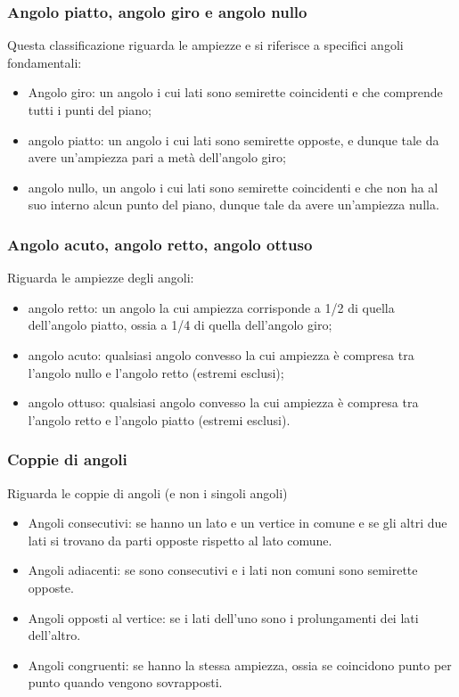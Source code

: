 \documentclass{report}
\begin{document}

\subsubsection{Angolo piatto, angolo giro e angolo nullo} %
\label{sec:Angolo piatto, angolo giro e angolo nullo}
Questa classificazione riguarda le ampiezze e si riferisce a specifici angoli fondamentali:
\begin{itemize}
  \item{Angolo giro: un angolo i cui lati sono semirette coincidenti e che comprende tutti i punti del piano;}
  \item{angolo piatto: un angolo i cui lati sono semirette opposte, e dunque tale da avere un'ampiezza pari a metà dell'angolo giro;}
  \item{angolo nullo, un angolo i cui lati sono semirette coincidenti e che non ha al suo interno alcun punto del piano, dunque tale da avere un'ampiezza nulla.}
\end{itemize}


\subsubsection{Angolo acuto, angolo retto, angolo ottuso} %
\label{sec:Angolo acuto, angolo retto, angolo ottuso}
Riguarda le ampiezze degli angoli:
\begin{itemize}
  \item{angolo retto: un angolo la cui ampiezza corrisponde a 1/2 di quella dell'angolo piatto, ossia a 1/4 di quella dell'angolo giro;}
  \item{angolo acuto: qualsiasi angolo convesso la cui ampiezza è compresa tra l'angolo nullo e l'angolo retto (estremi esclusi);}
  \item{angolo ottuso: qualsiasi angolo convesso la cui ampiezza è compresa tra l'angolo retto e l'angolo piatto (estremi esclusi).}
\end{itemize}

\subsubsection{Coppie di angoli} %
\label{sec:Coppie di angoli}
Riguarda le coppie di angoli (e non i singoli angoli)
\begin{itemize}
  \item{Angoli consecutivi: se hanno un lato e un vertice in comune e se gli altri due lati si trovano da parti opposte rispetto al lato comune.}
  \item{Angoli adiacenti: se sono consecutivi e i lati non comuni sono semirette opposte.}
  \item{Angoli opposti al vertice: se i lati dell'uno sono i prolungamenti dei lati dell'altro.}
  \item{Angoli congruenti: se hanno la stessa ampiezza, ossia se coincidono punto per punto quando vengono sovrapposti.}
\end{itemize}
\end{document}

